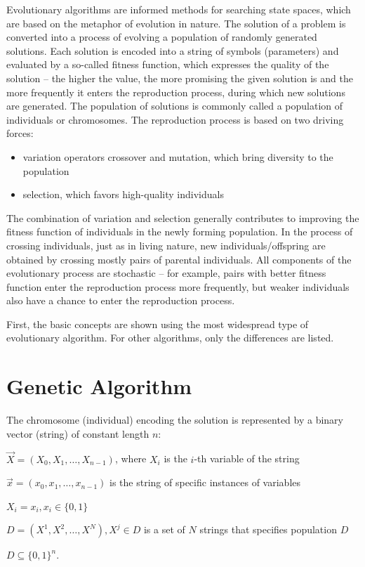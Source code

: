%
%
%
%
%
%
%
%
Evolutionary algorithms are informed methods for searching state spaces,
which \cite{evo} are based on the metaphor of evolution in nature. The solution of a problem is
converted into a process of evolving a population of randomly generated solutions. Each
solution is encoded into a string of symbols (parameters) and evaluated by a so-called fitness
function, which expresses the quality of the solution -- the higher the value, the more
promising the given solution is and the more frequently it enters the reproduction process, during which
new solutions are generated. The population of solutions is commonly called a population of individuals
or chromosomes. The reproduction process is based on two driving forces:

\begin{itemize}
\item variation operators crossover and mutation, which bring diversity
to the population
\item selection, which favors high-quality individuals
\end{itemize}

The combination of variation and selection generally contributes to improving the fitness function of individuals
in the newly forming population. In the process of crossing individuals, just as in living nature,
new individuals/offspring are obtained by crossing mostly pairs of parental
individuals. All components of the evolutionary process are stochastic -- for example, pairs with better fitness function
enter the reproduction process more frequently, but weaker
individuals also have a chance to enter the reproduction process.

First, the basic concepts are shown using the most widespread type of evolutionary algorithm. For other
algorithms, only the differences are listed.

\section{Genetic Algorithm}\label{secGA}

The chromosome (individual) encoding the solution is represented by a binary vector
(string) of constant length $n$:
\begin{description}
  \item $\vec{X} = (X_0, X_1, \dots, X_{n-1})$, where $X_i$ is the $i$-th variable of the string
  \item $\vec{x} = (x_0, x_1, \dots, x_{n-1})$ is the string of specific instances of variables
  \item $X_i = x_i, x_i \in \{0,1\}$
  \item $D = (X^1, X^2,\dots, X^N), X^j \in D$ is a set of $N$ strings that specifies population $D$
  \item $D \subseteq \{0,1\}^n$.
\end{description}

